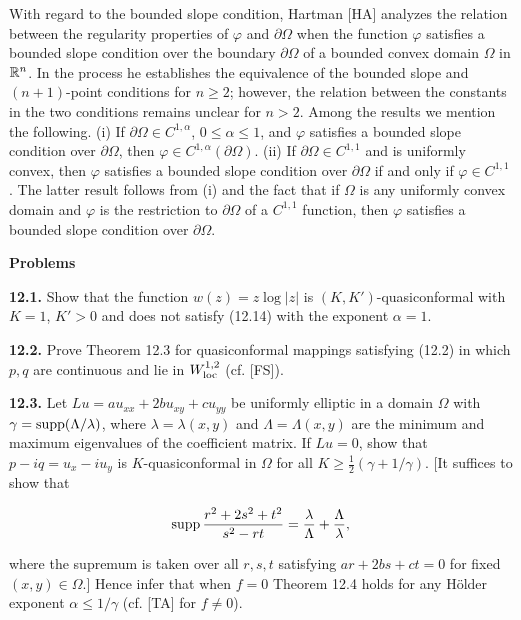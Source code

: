 With regard to the bounded slope condition, Hartman [HA] analyzes the relation between the regularity properties of $\varphi$ and $\partial\Omega$ when the function $\varphi$ satisfies a bounded slope condition over the boundary $\partial\Omega$ of a bounded convex domain $\Omega$ in $\mathbb{R}^n$. In the process he establishes the equivalence of the bounded slope and $(n+1)$-point conditions for $n\geq 2$; however, the relation between the constants in the two conditions remains unclear for $n>2$. Among the results we mention the following. (i) If $\partial\Omega\in C^{1,\alpha}$, $0\leq \alpha\leq 1$, and $\varphi$ satisfies a bounded slope condition over $\partial\Omega$, then $\varphi\in C^{1,\alpha}(\partial\Omega)$. (ii) If $\partial\Omega\in C^{1,1}$ and is uniformly convex, then $\varphi$ satisfies a bounded slope condition over $\partial\Omega$ if and only if $\varphi\in C^{1,1}$. The latter result follows from (i) and the fact that if $\Omega$ is any uniformly convex domain and $\varphi$ is the restriction to $\partial\Omega$ of a $C^{1,1}$ function, then $\varphi$ satisfies a bounded slope condition over $\partial\Omega$.

\vspace{1em}

\textbf{Problems}

\medskip

\noindent\textbf{12.1.} Show that the function $w(z)=z\log|z|$ is $(K,K')$-quasiconformal with $K=1$, $K'>0$ and does not satisfy (12.14) with the exponent $\alpha=1$.

\medskip

\noindent\textbf{12.2.} Prove Theorem 12.3 for quasiconformal mappings satisfying (12.2) in which $p,q$ are continuous and lie in $W^{1,2}_{\mathrm{loc}}$ (cf. [FS]).

\medskip

\noindent\textbf{12.3.} Let $Lu=au_{xx}+2bu_{xy}+cu_{yy}$ be uniformly elliptic in a domain $\Omega$ with $\gamma=\operatorname{supp}(\Lambda/\lambda)$, where $\lambda=\lambda(x,y)$ and $\Lambda=\Lambda(x,y)$ are the minimum and maximum eigenvalues of the coefficient matrix. If $Lu=0$, show that $p-iq=u_x-iu_y$ is $K$-quasiconformal in $\Omega$ for all $K\geq \frac12(\gamma+1/\gamma)$. [It suffices to show that

\[
\operatorname{supp} \frac{r^2+2s^2+t^2}{s^2-rt}=\frac{\lambda}{\Lambda}+\frac{\Lambda}{\lambda},
\]

where the supremum is taken over all $r,s,t$ satisfying $ar+2bs+ct=0$ for fixed $(x,y)\in\Omega$.] Hence infer that when $f=0$ Theorem 12.4 holds for any Hölder exponent $\alpha\leq 1/\gamma$ (cf. [TA] for $f\neq 0$).

